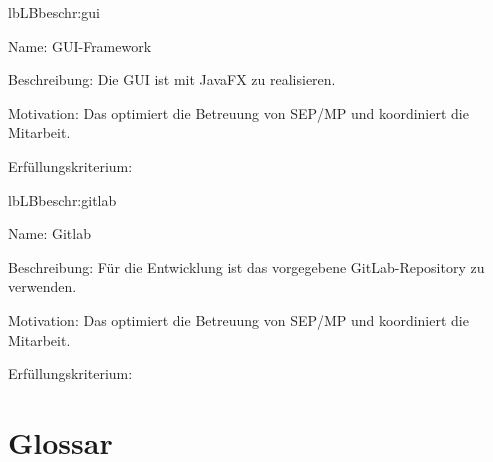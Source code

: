 \begin{description}[leftmargin=5em, style=sameline]
	\begin{lhp}{lb}{LB}{beschr:gui}
		\item [Name:] GUI-Framework
		\item [Beschreibung:] Die GUI ist mit JavaFX zu realisieren.
		\item [Motivation:] Das optimiert die Betreuung von SEP/MP und koordiniert die Mitarbeit.
		\item [Erfüllungskriterium:] 
	\end{lhp}
	
	\begin{lhp}{lb}{LB}{beschr:gitlab}
		\item [Name:] Gitlab
		\item [Beschreibung:] Für die Entwicklung ist das vorgegebene GitLab-Repository zu verwenden.
		\item [Motivation:] Das optimiert die Betreuung von SEP/MP und koordiniert die Mitarbeit.
		\item [Erfüllungskriterium:] 
	\end{lhp}
	
	
\end{description}

\section{Glossar}

